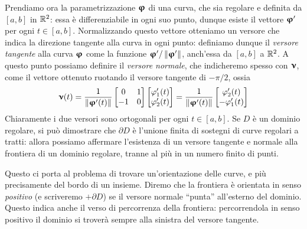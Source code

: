 Prendiamo ora la parametrizzazione $\bm{\upvarphi}$ di una curva, che sia regolare e definita da $[a,b]$ in $\mathbb{R}^2$: essa è differenziabile in ogni suo punto, dunque esiste il vettore $\bm{\upvarphi}'$ per ogni $t\in[a,b]$.
Normalizzando questo vettore otteniamo un versore che indica la direzione tangente alla curva in ogni punto: definiamo dunque il \emph{versore tangente} alla curva $\bm{\upvarphi}$ come la funzione $\bm{\upvarphi}'/\left\|{\bm{\upvarphi}'}\right\|$, anch'essa da $[a,b]$ a $\mathbb{R}^2$.
A questo punto possiamo definire il \emph{versore normale}, che indicheremo spesso con $\bm{\upnu}$, come il vettore ottenuto ruotando il versore tangente di $-\pi/2$, ossia
\begin{equation*}
	\bm{\upnu}(t)=\frac1{\left\|{\bm{\upvarphi}'(t)}\right\|}
	\begin{bmatrix}
		0&1\\-1&0
	\end{bmatrix}
	\begin{bmatrix}
		\varphi'_1(t)\\\varphi'_2(t)
	\end{bmatrix}
	=\frac1{\left\|{\bm{\upvarphi}'(t)}\right\|}
	\begin{bmatrix}
		\varphi'_2(t)\\-\varphi'_1(t)
	\end{bmatrix}
\end{equation*}
Chiaramente i due versori sono ortogonali per ogni $t\in[a,b]$.
Se $D$ è un dominio regolare, si può dimostrare che $\partial D$ è l'unione finita di sostegni di curve regolari a tratti: allora possiamo affermare l'esistenza di un versore tangente e normale alla frontiera di un dominio regolare, tranne al più in un numero finito di punti.

Questo ci porta al problema di trovare un'orientazione delle curve, e più precisamente del bordo di un insieme.
Diremo che la frontiera è orientata in senso \emph{positivo} (e scriveremo $+\partial D$) se il versore normale ``punta'' all'esterno del dominio.
Questo indica anche il verso di percorrenza della frontiera: percorrendola in senso positivo il dominio si troverà sempre alla sinistra del versore tangente.


